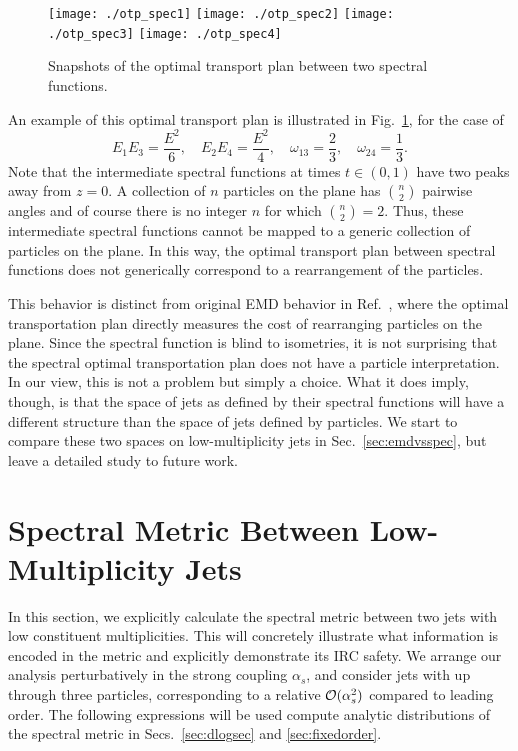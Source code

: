 \documentclass[letterpaper,11pt]{article}
\DeclareRobustCommand{\Sec}[1]{Sec.~\ref{#1}}
\DeclareRobustCommand{\Secs}[2]{Secs.~\ref{#1} and \ref{#2}}
\DeclareRobustCommand{\Fig}[1]{Fig.~\ref{#1}}
\DeclareRobustCommand{\InRef}[1]{Ref.~\cite{#1}}
\begin{document}
\begin{figure}[t]
\begin{center}
\texttt{[image: ./otp\_spec1]} \texttt{[image: ./otp\_spec2]} \texttt{[image: ./otp\_spec3]} \texttt{[image: ./otp\_spec4]}
\caption{\label{fig:otp_spec}
Snapshots of the optimal transport plan between two spectral functions.
}
\end{center}
\end{figure}

An example of this optimal transport plan is illustrated in \Fig{fig:otp_spec}, for the case of
%
\begin{equation}
E_1 E_3 = \frac{E^2}{6}, \quad E_2 E_4 = \frac{E^2}{4}, \quad \omega_{13} = \frac{2}{3}, \quad \omega_{24} = \frac{1}{3}.
\end{equation}
%
Note that the intermediate spectral functions at times $t\in(0,1)$ have two peaks away from $z=0$.
%
A collection of $n$ particles on the plane has ${n\choose 2}$ pairwise angles and of course there is no integer $n$ for which ${n\choose 2}=2$.
%
Thus, these intermediate spectral functions cannot be mapped to a generic collection of particles on the plane.
%
In this way, the optimal transport plan between spectral functions does not generically correspond to a rearrangement of the particles.


This behavior is distinct from original EMD behavior in \InRef{Komiske:2019fks}, where the optimal transportation plan directly measures the cost of rearranging particles on the plane.
%
Since the spectral function is blind to isometries, it is not surprising that the spectral optimal transportation plan does not have a particle interpretation.
%
In our view, this is not a problem but simply a choice.
%
What it does imply, though, is that the space of jets as defined by their spectral functions will have a different structure than the space of jets defined by particles.
%
We start to compare these two spaces on low-multiplicity jets in \Sec{sec:emdvsspec}, but leave a detailed study to future work.


\section{Spectral Metric Between Low-Multiplicity Jets}
\label{sec:multcalc}

In this section, we explicitly calculate the spectral metric between two jets with low constituent multiplicities.
%
This will concretely illustrate what information is encoded in the metric and explicitly demonstrate its IRC safety.
%
We arrange our analysis perturbatively in the strong coupling $\alpha_s$, and consider jets with up through three particles, corresponding to a relative ${\cal O}(\alpha_s^2)$ compared to leading order.
%
The following expressions will be used compute analytic distributions of the spectral metric in \Secs{sec:dlogsec}{sec:fixedorder}.
\end{document}
